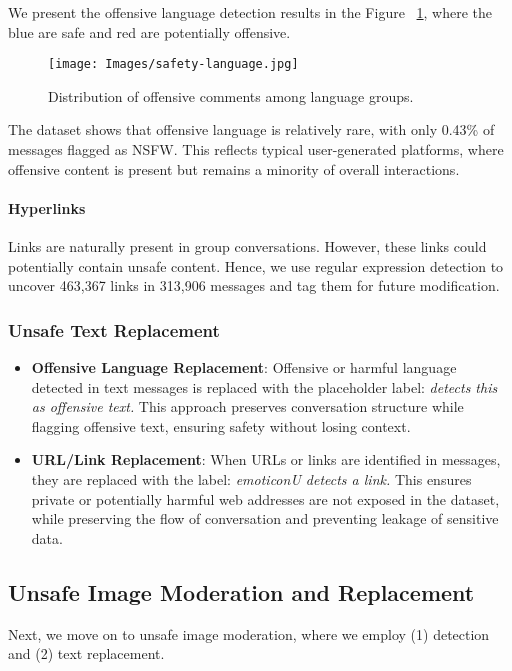 We present the offensive language detection results in the Figure ~\ref{fig:image-detection}, where the blue are safe and red are potentially offensive.

\begin{figure}[htbp]
    \centering
    \texttt{[image: Images/safety-language.jpg]}
    \caption{Distribution of offensive comments among language groups.}
    \label{fig:image-detection}
\end{figure}

The dataset shows that offensive language is relatively rare, with only 0.43\% of messages flagged as NSFW. This reflects typical user-generated platforms, where offensive content is present but remains a minority of overall interactions.

\paragraph{Hyperlinks}
Links are naturally present in group conversations. However, these links could potentially contain unsafe content. Hence, we use regular expression \cite{regex} detection to uncover 463,367 links in 313,906 messages and tag them for future modification.

\subsubsection{Unsafe Text Replacement}
\begin{itemize}
    \item \textbf{Offensive Language Replacement}:  
    Offensive or harmful language detected in text messages is replaced with the placeholder label:  
    \textit{detects this as offensive text.}  
    This approach preserves conversation structure while flagging offensive text, ensuring safety without losing context.
    
    \item \textbf{URL/Link Replacement}:  
    When URLs or links are identified in messages, they are replaced with the label:  
    \textit{emoticonU detects a link.}  
    This ensures private or potentially harmful web addresses are not exposed in the dataset, while preserving the flow of conversation and preventing leakage of sensitive data.
\end{itemize}

\subsection{Unsafe Image Moderation and Replacement}
Next, we move on to unsafe image moderation, where we employ (1) detection and (2) text replacement.

